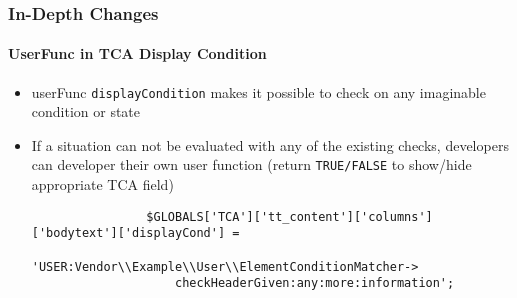 \begin{frame}[fragile]
	\frametitle{In-Depth Changes}
	\framesubtitle{UserFunc in TCA Display Condition}

	\begin{itemize}
		\item userFunc \texttt{displayCondition} makes it possible to check on any imaginable condition or state
		\item If a situation can not be evaluated with any of the existing checks, developers
			can developer their own user function\newline
			(return \texttt{TRUE/FALSE} to show/hide appropriate TCA field)

			\begin{lstlisting}
				$GLOBALS['TCA']['tt_content']['columns']['bodytext']['displayCond'] =
				  'USER:Vendor\\Example\\User\\ElementConditionMatcher->
				    checkHeaderGiven:any:more:information';
			\end{lstlisting}

	\end{itemize}

\end{frame}


